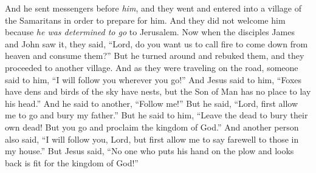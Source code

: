 \begin{biblechapter}
\verse And he sent messengers before \textit{him}, and they went and entered into a village of the Samaritans in order to prepare for him.
\verse And they did not welcome him because \textit{he was determined to go} to Jerusalem.
\verse Now when the disciples James and John saw it, they said, “Lord, do you want us to call fire to come down from heaven and consume them?”
\verse But he turned around and rebuked them,
\verse and they proceeded to another village.
 And as they were traveling on the road, someone said to him, “I will follow you wherever you go!”
\verse And Jesus said to him, “Foxes have dens and birds of the sky have nests, but the Son of Man has no place to lay his head.”
\verse And he said to another, “Follow me!” But he said, “Lord, first allow me to go and bury my father.”
\verse But he said to him, “Leave the dead to bury their own dead! But you go and proclaim the kingdom of God.”
\verse And another person also said, “I will follow you, Lord, but first allow me to say farewell to those in my house.”
\verse But Jesus said, “No one who puts his hand on the plow and looks back is fit for the kingdom of God!”
\end{biblechapter}

